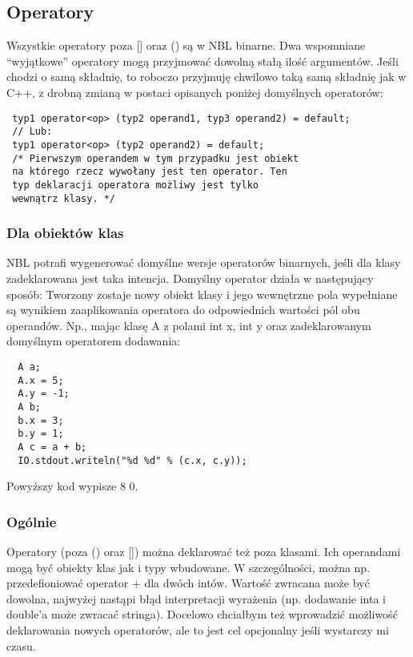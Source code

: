 \documentclass[a4paper,10pt]{scrartcl}
\begin{document}
\subsection{Operatory}
Wszystkie operatory poza [] oraz () są w NBL binarne. Dwa wspomniane ``wyjątkowe'' operatory mogą przyjmować dowolną stałą ilość argumentów.
Jeśli chodzi o samą składnię, to roboczo przyjmuję chwilowo taką samą składnię jak w C++, z drobną zmianą w postaci opisanych poniżej domyślnych
operatorów:
\begin{lstlisting}
 typ1 operator<op> (typ2 operand1, typ3 operand2) = default;
 // Lub:
 typ1 operator<op> (typ2 operand2) = default; 
 /* Pierwszym operandem w tym przypadku jest obiekt 
 na którego rzecz wywołany jest ten operator. Ten 
 typ deklaracji operatora możliwy jest tylko 
 wewnątrz klasy. */
\end{lstlisting}

\subsubsection{Dla obiektów klas}
NBL potrafi wygenerować domyślne wersje operatorów binarnych, jeśli dla klasy zadeklarowana jest taka intencja. Domyślny operator działa w następujący
sposób: Tworzony zostaje nowy obiekt klasy i jego wewnętrzne pola wypełniane są wynikiem zaaplikowania operatora do odpowiednich wartości pól obu
operandów. Np., mając klasę A z polami int x, int y oraz zadeklarowanym domyślnym operatorem dodawania:

\begin{lstlisting}
  A a;
  A.x = 5;
  A.y = -1;
  A b;
  b.x = 3;
  b.y = 1;
  A c = a + b;
  IO.stdout.writeln("%d %d" % (c.x, c.y));
\end{lstlisting}

Powyższy kod wypisze 8 0.

\subsubsection{Ogólnie}
Operatory (poza () oraz []) można deklarować też poza klasami. Ich operandami mogą być obiekty klas jak i typy wbudowane. W szczególności, można np.
przedefioniować operator + dla dwóch intów. Wartość zwracana może być dowolna, najwyżej nastąpi błąd interpretacji wyrażenia (np. dodawanie inta i
double'a może zwracać stringa). Docelowo chciałbym też wprowadzić możliwość deklarowania nowych operatorów, ale to jest cel opcjonalny jeśli
wystarczy mi czasu.
\end{document}
